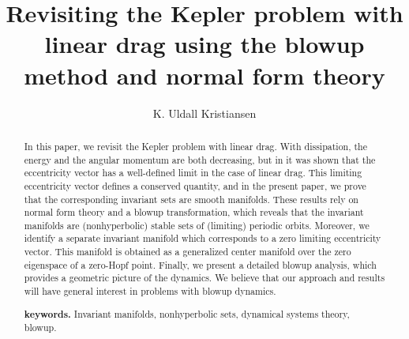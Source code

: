\documentclass[reqno,12pt]{amsart}
\newcommand{\note}[1]{\vspace{5 mm}\par \noindent
\marginpar{\textsc{Note}} \framebox{\begin{minipage}[c]{0.95
\textwidth} \flushleft \tt #1 \end{minipage}}\vspace{5 mm}\par}
\numberwithin{equation}{section}
\newcommand\WM[1]{{\color{black}{#1}}} %
\begin{document}
\title{Revisiting the Kepler problem with linear drag using the blowup method and normal form theory}%
\author{K. Uldall Kristiansen}
\address{Department of Applied Mathematics and Computer Science, 
Technical University of Denmark, 
2800 Kgs. Lyngby, 
Denmark }


 

 \begin{abstract}

In this paper, we revisit the Kepler problem with linear drag. With dissipation, the energy and the angular momentum are both decreasing, but in \cite{margheri2017a} it was shown that the eccentricity vector has a well-defined limit in the case of linear drag. This limiting eccentricity vector defines a conserved quantity, and in the present paper, we prove that the corresponding invariant sets are smooth manifolds. These results rely on normal form theory and a blowup transformation, which reveals that the invariant manifolds are (nonhyperbolic) stable sets of (limiting) periodic orbits. Moreover, we identify a separate invariant manifold which corresponds
 to a zero limiting eccentricity vector. This manifold is obtained as a generalized center manifold over the zero eigenspace of a zero-Hopf point. Finally, we present a detailed blowup analysis, which provides a geometric picture of the dynamics. %
We believe that our approach and results will have general interest in problems with blowup dynamics.
\bigskip
\smallskip

\noindent \textbf{keywords.} Invariant manifolds, nonhyperbolic sets, dynamical systems theory, blowup. 
 \end{abstract}
 \maketitle
\maketitle
\end{document}
